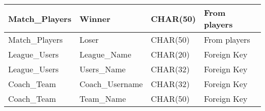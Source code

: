 \documentclass{article}
\begin{document}
\begin{table}[H]
\begin{tabular}{|l|l|l|l|}
    {\color[HTML]{2E3436} Match\_Players} & {\color[HTML]{2E3436} Winner} & {\color[HTML]{2E3436} CHAR(50)} & {\color[HTML]{2E3436} From players} \\ \hline
    {\color[HTML]{2E3436} Match\_Players} & {\color[HTML]{2E3436} Loser} & {\color[HTML]{2E3436} CHAR(50)} & {\color[HTML]{2E3436} From players} \\ \hline
    {\color[HTML]{2E3436} League\_Users} & {\color[HTML]{2E3436} League\_Name} & {\color[HTML]{2E3436} CHAR(20)} & {\color[HTML]{2E3436} Foreign Key} \\ \hline
    {\color[HTML]{2E3436} League\_Users} & {\color[HTML]{2E3436} Users\_Name} & {\color[HTML]{2E3436} CHAR(32)} & {\color[HTML]{2E3436} Foreign Key} \\ \hline
    {\color[HTML]{2E3436} Coach\_Team} & {\color[HTML]{2E3436} Coach\_Username} & {\color[HTML]{2E3436} CHAR(32)} & {\color[HTML]{2E3436} Foreign Key} \\ \hline
    {\color[HTML]{2E3436} Coach\_Team} & {\color[HTML]{2E3436} Team\_Name} & {\color[HTML]{2E3436} CHAR(50)} & {\color[HTML]{2E3436} Foreign Key} \\ \hline
    \end{tabular}
\end{table}
\end{document}
